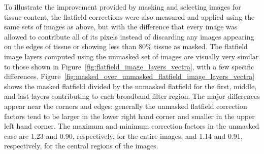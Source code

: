 \documentclass[letterpaper,11pt]{article}
\newcommand{\reffig}[1]{Figure~\ref{#1}}
\begin{document}
To illustrate the improvement provided by masking and selecting images for tissue content, the flatfield corrections were also measured and applied using the same sets of images as above, but with the difference that every image was allowed to contribute all of its pixels instead of discarding any images appearing on the edges of tissue or showing less than 80\% tissue as masked. The flatfield image layers computed using the unmasked set of images are visually very similar to those shown in \reffig{fig:flatfield_image_layers_vectra}, with a few specific differences. \reffig{fig:masked_over_unmasked_flatfield_image_layers_vectra} shows the masked flatfield divided by the unmasked flatfield for the first, middle, and last layers contributing to each broadband filter region. The major differences appear near the corners and edges: generally the unmasked flatfield correction factors tend to be larger in the lower right hand corner and smaller in the upper left hand corner. The maximum and minimum correction factors in the unmasked case are 1.23 and 0.90, respectively, for the entire images, and 1.14 and 0.91, respectively, for the central regions of the images.
\end{document}
